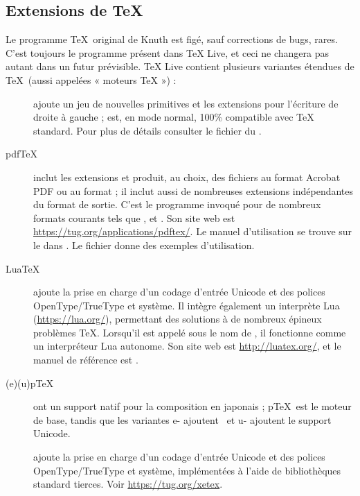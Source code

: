 \documentclass[german, english, french]{article}
\renewcommand{\TL}{\TeX{} Live\xspace}%
\begin{document}
\subsection{Extensions de \protect\TeX}
\label{sec:tex-extensions}

Le programme \TeX\ original de Knuth est figé, sauf corrections de bugs,
rares. C'est toujours le programme  présent dans \TL, et ceci ne
changera pas autant dans un futur prévisible. \TL contient plusieurs variantes
étendues de \TeX\ (aussi appelées « moteurs \TeX{} ») :

\begin{description}

\item [\eTeX{}] \label{text:etex} ajoute un jeu de nouvelles primitives et les
  extensions \TeXXeT{} pour l'écriture de droite à gauche ; \eTeX{} est, en mode
  normal, 100\% compatible avec \TeX{} standard.  Pour plus de détails consulter
  le fichier  du \DVD{}.

\item[pdf\TeX{}] inclut les extensions \eTeX{} et produit, au choix, des
  fichiers au format Acrobat PDF ou au format \dvi{} ; il inclut aussi de
  nombreuses extensions indépendantes du format de sortie. C'est le programme
  invoqué pour de nombreux formats courants tels que , 
  et . Son site web est
  \url{https://tug.org/applications/pdftex/}.  Le manuel d'utilisation se trouve
  sur le \DVD{} dans . Le
  fichier  donne des
  exemples d'utilisation.

\item[Lua\TeX] ajoute la prise en charge d'un codage d'entrée Unicode et des
  polices OpenType/TrueType et système. Il intègre également un interprète Lua
  (\url{https://lua.org/}), permettant des solutions à de nombreux épineux
  problèmes \TeX{}. Lorsqu'il est appelé sous le nom de , il
  fonctionne comme un interpréteur Lua autonome. Son site web est
  \url{http://luatex.org/}, et le manuel de référence est
  .

\item[(e)(u)p\TeX] ont un support natif pour la composition en japonais ; p\TeX\
  est le moteur de base, tandis que les variantes e- ajoutent \eTeX\ et u-
  ajoutent le support Unicode.

\item[\XeTeX] ajoute la prise en charge d'un codage d'entrée Unicode et des
  polices OpenType/TrueType et système, implémentées à l'aide de bibliothèques
  standard tierces. Voir \url{https://tug.org/xetex}.


\end{description}
\end{document}
